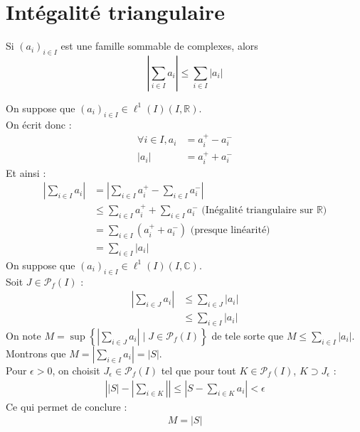 \documentclass[../main.tex]{subfiles}
\begin{document}
\section{Intégalité triangulaire}
\begin{tcolorbox}[title=Propostion 25.29, title filled=false, colframe=lightblue, colback=lightblue!10!white]
    Si $\left(a_i\right)_{i \in I}$ est une famille sommable de complexes, alors
    $$\left|\sum_{i \in I} a_i\right| \leq \sum_{i \in I}\left|a_i\right|$$
\end{tcolorbox}

\noindent On suppose que $(a_i)_{i\in I}\in \ell^1(I)(I, \mathbb{R})$. \\
On écrit donc : 
\begin{align*}
    \forall i\in I, a_i &= a_i^{+} - a_i^{-} \\
    |a_i| &= a_i^{+} + a_i^{-}
\end{align*}
Et ainsi : 
\begin{align*}
    \left| \sum_{i\in I} a_i \right| &= \left| \sum_{i\in I} a_i^+ - \sum_{i\in I} a_i^- \right| \\
    &\leq \sum_{i\in I} a_i^+ + \sum_{i\in I} a_i^- \text{ (Inégalité triangulaire sur $\mathbb{R}$)} \\
    &= \sum_{i\in I} (a_i^+ + a_i^-) \text{ (presque linéarité)} \\
    &= \sum_{i\in I} |a_i|
\end{align*}
On suppose que $(a_i)_{i\in I}\in \ell^1(I)(I, \mathbb{C})$. \\
Soit $J\in \mathcal{P}_f(I)$ : 
\begin{align*}
    \left| \sum_{i\in J} a_i \right| &\leq \sum_{i\in J} |a_i| \\
    &\leq \sum_{i\in I} |a_i|
\end{align*}
On note $M = \sup \left\{ \left| \sum\limits_{i\in J} a_i \right|\mid J\in \mathcal{P}_f(I) \right\}$ de tele sorte que $M\leq \sum\limits_{i\in I} |a_i|$. \\
Montrons que $M = \left| \sum\limits_{i\in I} a_i \right| = |S|$. \\
Pour $\epsilon > 0$, on choisit $J_{\epsilon}\in \mathcal{P}_f(I)$ tel que pour tout $K\in \mathcal{P}_f(I)$, $K\supset J_{\epsilon}$ : 
\begin{align*}
    \left| |S| - \left| \sum_{i\in K} \right| \right| \leq \left| S - \sum_{i\in K} a_i \right| < \epsilon
\end{align*}
Ce qui permet de conclure : 
\begin{align*}
    M = |S|
\end{align*}
\end{document}
